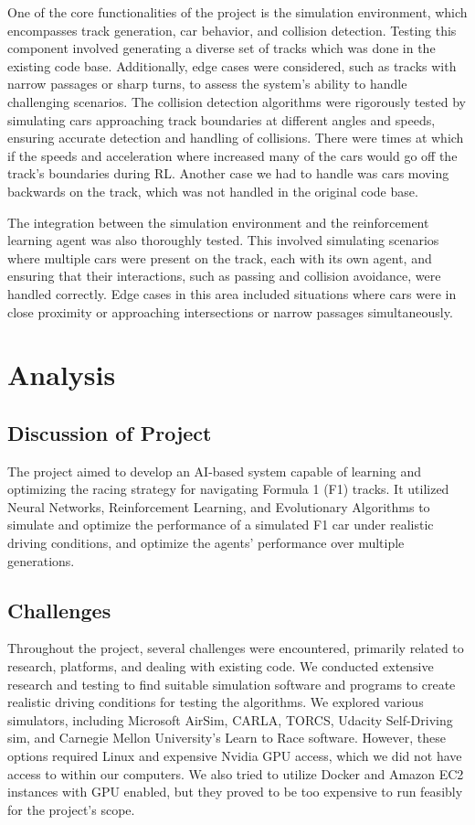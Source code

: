 \documentclass[12pt]{article}
\begin{document}
One of the core functionalities of the project is the simulation environment, 
which encompasses track generation, car behavior, and collision detection. 
Testing this component involved generating a diverse set of tracks which was 
done in the existing code base. Additionally, edge cases were considered, such 
as tracks with narrow passages or sharp turns, to assess the system's ability 
to handle challenging scenarios. The collision detection algorithms were 
rigorously tested by simulating cars approaching track boundaries at different 
angles and speeds, ensuring accurate detection and handling of collisions. There 
were times at which if the speeds and acceleration where increased many of the 
cars would go off the track's boundaries during RL. Another case we had to handle 
was cars moving backwards on the track, which was not handled in the original
code base.

The integration between the simulation environment and the reinforcement 
learning agent was also thoroughly tested. This involved simulating scenarios 
where multiple cars were present on the track, each with its own agent, and 
ensuring that their interactions, such as passing and collision avoidance, were 
handled correctly. Edge cases in this area included situations where cars were 
in close proximity or approaching intersections or narrow passages 
simultaneously.

\section{Analysis}

\subsection{Discussion of Project}

The project aimed to develop an AI-based system capable of learning and 
optimizing the racing strategy for navigating Formula 1 (F1) tracks. It 
utilized Neural Networks, Reinforcement Learning, and Evolutionary Algorithms 
to simulate and optimize the performance of a simulated F1 car under realistic 
driving conditions, and optimize the agents' performance over multiple generations.

\subsection{Challenges}

Throughout the project, several challenges were encountered, primarily related 
to research, platforms, and dealing with existing code. We conducted extensive 
research and testing to find suitable simulation software and programs to 
create realistic driving conditions for testing the algorithms. We explored 
various simulators, including Microsoft AirSim, CARLA, TORCS, Udacity 
Self-Driving sim, and Carnegie Mellon University's Learn to Race software. 
However, these options required Linux and expensive Nvidia GPU access, which 
we did not have access to within our computers. We also tried to utilize Docker 
and Amazon EC2 instances with GPU enabled, but they proved to be too expensive 
to run feasibly for the project's scope.
\end{document}
